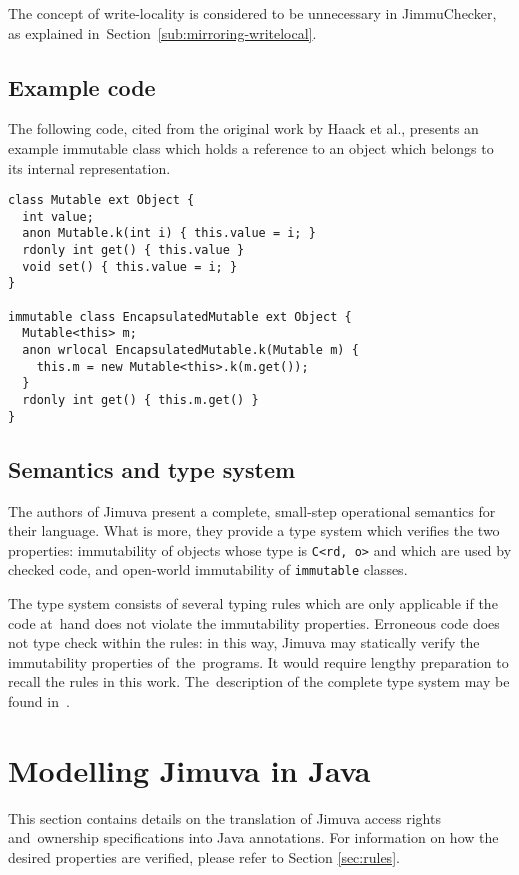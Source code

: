 \documentclass{pracamgr}
\theoremstyle{break}
\theoremstyle{break}
\theoremstyle{break}
\begin{document}
The concept of write-locality is considered to be unnecessary in
JimmuChecker, as explained in~Section~\ref{sub:mirroring-writelocal}.

\subsection{Example code}

The following code, cited from the original work by Haack et al.,
presents an example immutable class which holds a reference to an
object which belongs to its internal representation.

\begin{lstlisting}
class Mutable ext Object {
  int value; 
  anon Mutable.k(int i) { this.value = i; }
  rdonly int get() { this.value }
  void set() { this.value = i; }
}

immutable class EncapsulatedMutable ext Object {
  Mutable<this> m; 
  anon wrlocal EncapsulatedMutable.k(Mutable m) {
    this.m = new Mutable<this>.k(m.get()); 
  }
  rdonly int get() { this.m.get() }
}
\end{lstlisting}

\subsection{Semantics and type system}

The authors of Jimuva present a complete, small-step operational
semantics for their language. What is more, they provide a type system
which verifies the two properties: immutability of objects whose type
is \texttt{C<rd, o>} and which are used by checked code, and
open-world immutability of \texttt{immutable} classes. 

The type system consists of several typing rules which are only
applicable if the code at~hand does not violate the immutability
properties. Erroneous code does not type check within the rules: in
this way, Jimuva may statically verify the immutability properties
of~the~programs. It would require lengthy preparation to recall the
rules in this work. The~description of the complete type system may be
found in~\cite{haack}.

\section{Modelling Jimuva in Java}
\label{sec:modelling}

This section contains details on the translation of Jimuva access
rights and~ownership spe\-ci\-fi\-ca\-tions into Java annotations. For
information on how the desired properties are verified, please refer
to Section \ref{sec:rules}.
\end{document}
